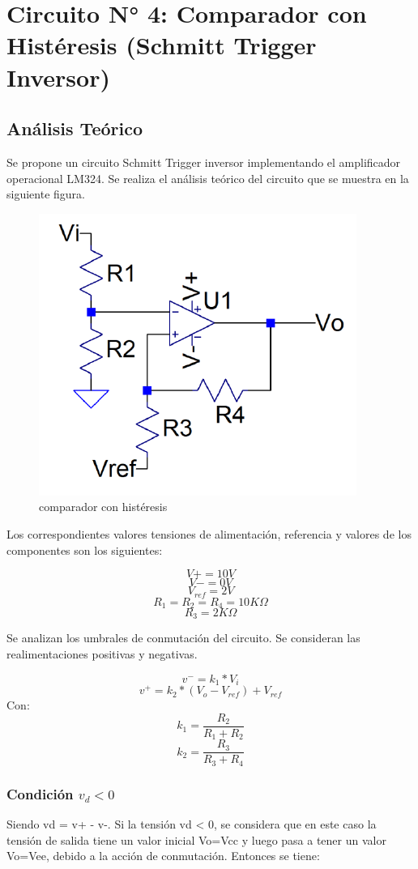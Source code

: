 \section{Circuito N° 4: Comparador con Histéresis (Schmitt Trigger Inversor)}



\subsection{Análisis Teórico}

Se propone un circuito Schmitt Trigger inversor implementando el amplificador operacional LM324. Se realiza el análisis teórico del circuito que se muestra en la siguiente figura. 


\begin{figure}[h!]
    \centering
    \includegraphics[width=0.50\linewidth]{Secciones/Circuito4/Circuito 4.png}
    \caption{comparador con histéresis}
    \label{fig:Circuito4}
\end{figure}

Los correspondientes valores tensiones de alimentación, referencia y valores de los componentes son los siguientes:

\[V+ = 10V\]
\[V- = 0V\]
\[V_{ref} = 2V\]
\[R_1 = R_2 = R_4 = 10K\Omega\]
\[R_3 = 2K\Omega\]

Se analizan los umbrales de conmutación del circuito. Se consideran las realimentaciones positivas y negativas.

\[v^- = k_1 * V_i\]
\[v^+ = k_2 * (V_o - V_{ref}) + V_{ref}\]
Con:
\[k_1 = \frac{R_2}{R_1 + R_2}\]
\[ k_2 = \frac{R_3}{R_3 + R_4}\]
\subsubsection{Condición \texorpdfstring{$v_d < 0$}{vd < 0}}
Siendo vd = v+ - v-. Si la tensión vd < 0, se considera que en este caso la tensión de salida tiene un valor inicial Vo=Vcc y luego pasa a tener un valor Vo=Vee, debido a la acción de conmutación.  Entonces se tiene:

